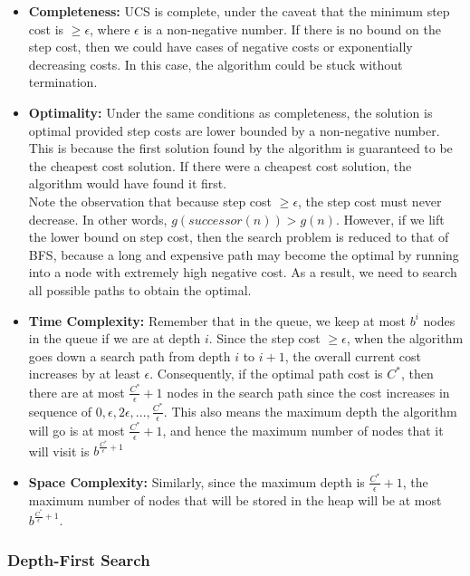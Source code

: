 \documentclass[12pt]{article}
\begin{document}
\begin{itemize}
\item \textbf{Completeness:} UCS is complete, under the caveat that the minimum step cost is $\geq \epsilon$, where $\epsilon$ is a non-negative number. If there is no bound on the step cost, then we could have cases of negative costs or exponentially decreasing costs. In this case, the algorithm could be stuck without termination.

\item \textbf{Optimality:} Under the same conditions as completeness, the solution is optimal provided step costs are lower bounded by a non-negative number. This is because the first solution found by the algorithm is guaranteed to be the cheapest cost solution. If there were a cheapest cost solution, the algorithm would have found it first.\\

Note the observation that because step cost $\geq \epsilon$, the step cost must never decrease. In other words, $g(successor(n)) > g(n)$. However, if we lift the lower bound on step cost, then the search problem is reduced to that of BFS, because a long and expensive path may become the optimal by running into a node with extremely high negative cost. As a result, we need to search all possible paths to obtain the optimal.

\item \textbf{Time Complexity:} Remember that in the queue, we keep at most $b^i$ nodes in the queue if we are at depth $i$. Since the step cost $\geq \epsilon$, when the algorithm goes down a search path from depth $i$ to $i+1$, the overall current cost increases by at least $\epsilon$. Consequently, if the optimal path cost is $C^*$, then there are at most $\frac{C^*}{\epsilon} + 1$ nodes in the search path since the cost increases in sequence of $0, \epsilon, 2\epsilon,...,  \frac{C^*}{\epsilon}$. This also means the maximum depth the algorithm will go is at most $\frac{C^*}{\epsilon} + 1$, and hence the maximum number of nodes that it will visit is $b^{\frac{C^*}{\epsilon} + 1}$

\item \textbf{Space Complexity:} Similarly, since the maximum depth is $\frac{C^*}{\epsilon} + 1$, the maximum number of nodes that will be stored in the heap will be at most $b^{\frac{C^*}{\epsilon} + 1}$.
\end{itemize}

\subsubsection{Depth-First Search}
\end{document}
